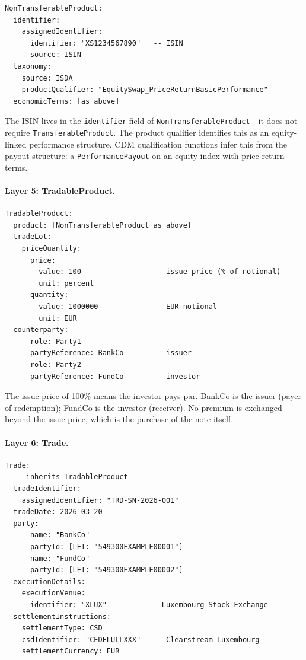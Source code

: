 \documentclass[11pt,a4paper]{article}
\begin{document}
\begin{lstlisting}
NonTransferableProduct:
  identifier:
    assignedIdentifier:
      identifier: "XS1234567890"   -- ISIN
      source: ISIN
  taxonomy:
    source: ISDA
    productQualifier: "EquitySwap_PriceReturnBasicPerformance"
  economicTerms: [as above]
\end{lstlisting}

\noindent The ISIN lives in the \texttt{identifier} field of \texttt{NonTransferableProduct}---it does not require \texttt{TransferableProduct}. The product qualifier identifies this as an equity-linked performance structure. CDM qualification functions infer this from the payout structure: a \texttt{PerformancePayout} on an equity index with price return terms.

\paragraph{Layer 5: TradableProduct.}

\begin{lstlisting}
TradableProduct:
  product: [NonTransferableProduct as above]
  tradeLot:
    priceQuantity:
      price:
        value: 100                 -- issue price (% of notional)
        unit: percent
      quantity:
        value: 1000000             -- EUR notional
        unit: EUR
  counterparty:
    - role: Party1
      partyReference: BankCo       -- issuer
    - role: Party2
      partyReference: FundCo       -- investor
\end{lstlisting}

\noindent The issue price of 100\% means the investor pays par. BankCo is the issuer (payer of redemption); FundCo is the investor (receiver). No premium is exchanged beyond the issue price, which is the purchase of the note itself.

\paragraph{Layer 6: Trade.}

\begin{lstlisting}
Trade:
  -- inherits TradableProduct
  tradeIdentifier:
    assignedIdentifier: "TRD-SN-2026-001"
  tradeDate: 2026-03-20
  party:
    - name: "BankCo"
      partyId: [LEI: "549300EXAMPLE00001"]
    - name: "FundCo"
      partyId: [LEI: "549300EXAMPLE00002"]
  executionDetails:
    executionVenue:
      identifier: "XLUX"          -- Luxembourg Stock Exchange
  settlementInstructions:
    settlementType: CSD
    csdIdentifier: "CEDELULLXXX"   -- Clearstream Luxembourg
    settlementCurrency: EUR
\end{lstlisting}
\end{document}
